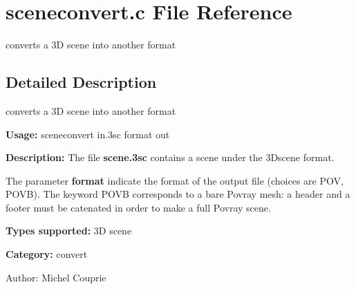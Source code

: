 \section{sceneconvert.c File Reference}
\label{sceneconvert_8c}
converts a 3D scene into another format 



\subsection{Detailed Description}
converts a 3D scene into another format 

{\bf Usage:} sceneconvert in.3sc format out

{\bf Description:} The file {\bf scene.3sc} contains a scene under the 3Dscene format.

The parameter {\bf format} indicate the format of the output file (choices are POV, POVB). The keyword POVB corresponds to a bare Povray mesh: a header and a footer must be catenated in order to make a full Povray scene.

{\bf Types supported:} 3D scene

{\bf Category:} convert

\begin{Desc}
\item[Author:]Michel Couprie \end{Desc}
